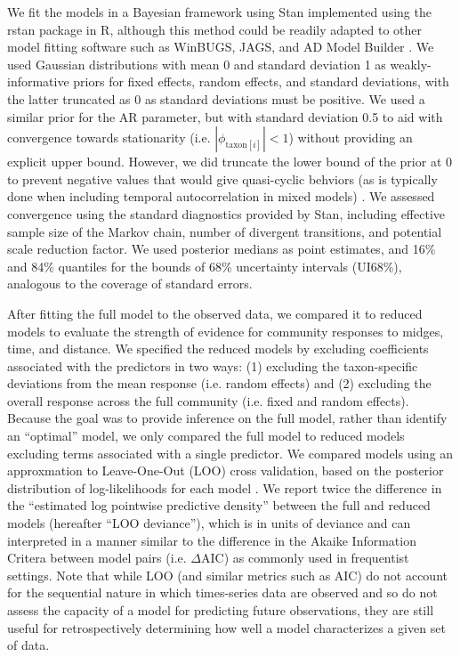 We fit the models in a Bayesian framework using Stan \citep{Carpenter2017}
implemented using the rstan \citep{Stan2018} package in R,
although this method could be readily adapted to other model fitting software
such as WinBUGS, JAGS, and AD Model Builder \citep{Bolker2013}.
We used Gaussian distributions with mean 0 and standard deviation 1 as
weakly-informative priors \citep{Gelman2017}
for fixed effects, random effects, and standard deviations,
with the latter truncated as 0 as standard deviations must be positive.
We used a similar prior for the AR parameter, but with standard deviation 0.5 to aid with
convergence towards stationarity (i.e. $|\phi_{\text{taxon}[i]}|<1$) without
providing an explicit upper bound.
However, we did truncate the lower bound of the prior at 0 to prevent negative
values that would give quasi-cyclic behviors (as is typically done when
including temporal autocorrelation in mixed models) \citep{Zuur2009}.
We assessed convergence using the standard diagnostics provided by Stan,
including effective sample size of the Markov chain, number of divergent
transitions, and potential scale reduction factor. We used posterior medians as point
estimates, and 16\% and 84\% quantiles
for the bounds of 68\% uncertainty intervals (UI68\%),
analogous to the coverage of standard errors.

After fitting the full model to the observed data, we compared it to reduced models
to evaluate the strength of evidence for community responses to midges, time,
and distance.
We specified the reduced models by excluding coefficients associated with the
predictors in two ways: (1) excluding the taxon-specific deviations from the mean
response (i.e. random effects) and (2) excluding the overall response across the
full community (i.e. fixed and random effects).
Because the goal was to provide inference on the full model, rather than identify
an ``optimal'' model, we only compared the full model to reduced models
excluding terms associated with a single predictor.
We compared models using an approxmation to Leave-One-Out (LOO) cross validation,
based on the posterior distribution of log-likelihoods for each model
\citep{Vehtari2017}.
We report twice the difference in the ``estimated log pointwise predictive density''
between the full and reduced models (hereafter ``LOO deviance''), which is in units of
deviance and can interpreted in a manner similar to the difference in the
Akaike Information Critera between model pairs (i.e. $\Delta$AIC) as
commonly used in frequentist settings.
Note that while LOO (and similar metrics such as AIC) do not account for the
sequential nature in which times-series data are observed and so do not assess the
capacity of a model for predicting future observations,
they are still useful for retrospectively determining
how well a model characterizes a given set of data.
